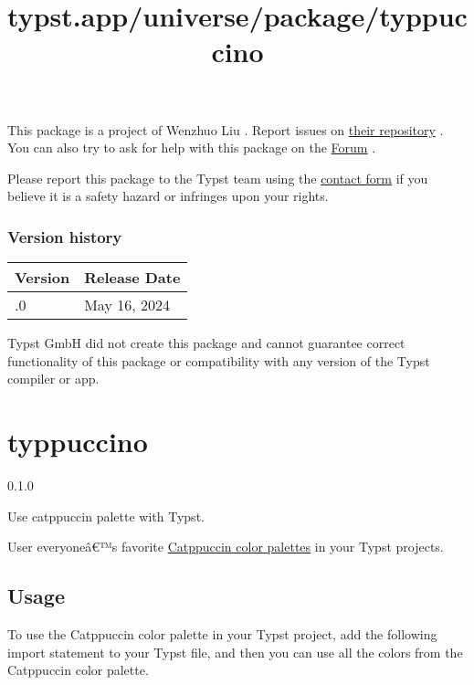 This package is a project of Wenzhuo Liu . Report issues on
\href{https://github.com/Enter-tainer/natrix}{their repository} . You
can also try to ask for help with this package on the
\href{https://forum.typst.app}{Forum} .

Please report this package to the Typst team using the
\href{https://typst.app/contact}{contact form} if you believe it is a
safety hazard or infringes upon your rights.

\label{versions}
\subsubsection{Version history}\label{version-history}

\begin{longtable}[]{@{}ll@{}}
\toprule\noalign{}
Version & Release Date \\
\midrule\noalign{}
\endhead
\bottomrule\noalign{}
\endlastfoot
0.1.0 & May 16, 2024 \\
\end{longtable}

Typst GmbH did not create this package and cannot guarantee correct
functionality of this package or compatibility with any version of the
Typst compiler or app.


\title{typst.app/universe/package/typpuccino}

\label{banner}
\section{typpuccino}\label{typpuccino}

{ 0.1.0 }

Use catppuccin palette with Typst.

\label{readme}
User everyoneâ€™s favorite
\href{https://github.com/catppuccin/catppuccin}{Catppuccin color
palettes} in your Typst projects.

\subsection{Usage}\label{usage}

To use the Catppuccin color palette in your Typst project, add the
following import statement to your Typst file, and then you can use all
the colors from the Catppuccin color palette.

\begin{Shaded}
\begin{Highlighting}[]

\end{Highlighting}
\end{Shaded}

